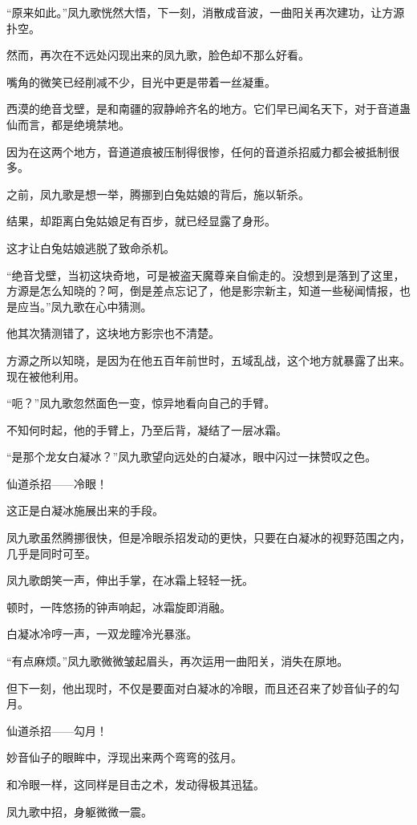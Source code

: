 \begin{this_body}
“原来如此。”凤九歌恍然大悟，下一刻，消散成音波，一曲阳关再次建功，让方源扑空。

然而，再次在不远处闪现出来的凤九歌，脸色却不那么好看。

嘴角的微笑已经削减不少，目光中更是带着一丝凝重。

西漠的绝音戈壁，是和南疆的寂静岭齐名的地方。它们早已闻名天下，对于音道蛊仙而言，都是绝境禁地。

因为在这两个地方，音道道痕被压制得很惨，任何的音道杀招威力都会被抵制很多。

之前，凤九歌是想一举，腾挪到白兔姑娘的背后，施以斩杀。

结果，却距离白兔姑娘足有百步，就已经显露了身形。

这才让白兔姑娘逃脱了致命杀机。

“绝音戈壁，当初这块奇地，可是被盗天魔尊亲自偷走的。没想到是落到了这里，方源是怎么知晓的？呵，倒是差点忘记了，他是影宗新主，知道一些秘闻情报，也是应当。”凤九歌在心中猜测。

他其次猜测错了，这块地方影宗也不清楚。

方源之所以知晓，是因为在他五百年前世时，五域乱战，这个地方就暴露了出来。现在被他利用。

“呃？”凤九歌忽然面色一变，惊异地看向自己的手臂。

不知何时起，他的手臂上，乃至后背，凝结了一层冰霜。

“是那个龙女白凝冰？”凤九歌望向远处的白凝冰，眼中闪过一抹赞叹之色。

仙道杀招——冷眼！

这正是白凝冰施展出来的手段。

凤九歌虽然腾挪很快，但是冷眼杀招发动的更快，只要在白凝冰的视野范围之内，几乎是同时可至。

凤九歌朗笑一声，伸出手掌，在冰霜上轻轻一抚。

顿时，一阵悠扬的钟声响起，冰霜旋即消融。

白凝冰冷哼一声，一双龙瞳冷光暴涨。

“有点麻烦。”凤九歌微微皱起眉头，再次运用一曲阳关，消失在原地。

但下一刻，他出现时，不仅是要面对白凝冰的冷眼，而且还召来了妙音仙子的勾月。

仙道杀招——勾月！

妙音仙子的眼眸中，浮现出来两个弯弯的弦月。

和冷眼一样，这同样是目击之术，发动得极其迅猛。

凤九歌中招，身躯微微一震。


\end{this_body}
